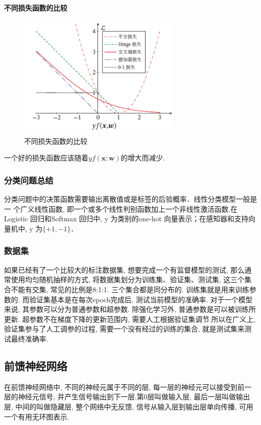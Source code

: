 \documentclass[a4paper]{article}
\theoremstyle{definition}
\numberwithin{equation}{section}
\begin{document}
\paragraph{不同损失函数的比较}
\begin{figure}
    \centering
    \includegraphics[width=0.7\textwidth]{loss_function.png}
    \caption{不同损失函数的比较}
\end{figure} 
一个好的损失函数应该随着$yf(\mathbf{x;w})$的增大而减少.

\subsubsection{分类问题总结}
分类问题中的决策函数需要输出离散值或是标签的后验概率．线性分类模型一般是一
个广义线性函数, 即一个或多个线性判别函数加上一个非线性激活函数.在Logistic 回归和Softmax 回归中, y 为类别的one-hot 向量表示；在感知器和支持向量机中, y 为$\{+1, -1\}$．



\subsubsection{数据集}
如果已经有了一个比较大的标注数据集, 想要完成一个有监督模型的测试, 那么通常使用均匀随机抽样的方式, 将数据集划分为训练集、验证集、测试集, 这三个集合不能有交集, 常见的比例是8:1:1. 三个集合都是同分布的. 
训练集就是用来训练参数的. 而验证集基本是在每次epoch完成后, 测试当前模型的准确率. 
对于一个模型来说, 其参数可以分为普通参数和超参数. 除强化学习外, 普通参数是可以被训练所更新. 超参数不在梯度下降的更新范围内, 需要人工根据验证集调节.所以在广义上, 验证集参与了人工调参的过程, 需要一个没有经过的训练的集合, 就是测试集来测试最终准确率. \citep{training_validation_test_Su}


\subsection{前馈神经网络}
在前馈神经网络中, 不同的神经元属于不同的层, 每一层的神经元可以接受到前一层的神经元信号, 并产生信号输出到下一层.第0层叫做输入层, 最后一层叫做输出层, 中间的叫做隐藏层, 整个网络中无反馈, 信号从输入层到输出层单向传播, 可用一个有用无环图表示.
\end{document}
